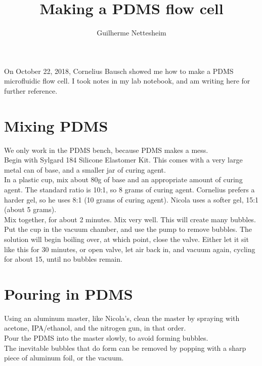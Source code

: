 \documentclass{article}
\author{Guilherme Nettesheim}
\title{Making a PDMS flow cell}
\begin{document}
\maketitle

On October 22, 2018, Cornelius Bausch showed me how to make a PDMS microfluidic flow cell. I took notes in my lab notebook, and am writing here for further reference.

\section{Mixing PDMS}

We only work in the PDMS bench, because PDMS makes a mess.\\

Begin with Sylgard 184 Silicone Elastomer Kit. This comes with a very large metal can of base, and a smaller jar of curing agent.\\

In a plastic cup, mix about 80g of base and an appropriate amount of curing agent. The standard ratio is 10:1, so 8 grams of curing agent. Cornelius prefers a harder gel, so he uses 8:1 (10 grams of curing agent). Nicola uses a softer gel, 15:1 (about 5 grams).\\

Mix together, for about 2 minutes. Mix very well. This will create many bubbles.\\

Put the cup in the vacuum chamber, and use the pump to remove bubbles. The solution will begin boiling over, at which point, close the valve. Either let it sit like this for 30 minutes, or open valve, let air back in, and vacuum again, cycling for about 15, until no bubbles remain.\\

\section{Pouring in PDMS}

Using an aluminum master, like Nicola's, clean the master by spraying with acetone, IPA/ethanol, and the nitrogen gun, in that order.\\

Pour the PDMS into the master slowly, to avoid forming bubbles.\\

The inevitable bubbles that do form can be removed by popping with a sharp piece of aluminum foil, or the vacuum.\\
\end{document}
